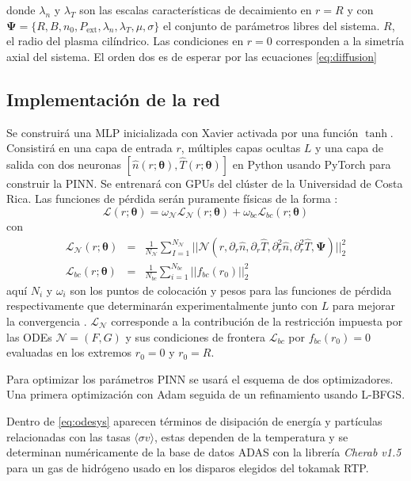 donde $\lambda_n$ y $\lambda_T$ son las escalas características de decaimiento en $r = R$ y con $\bm{\Psi} = \{R, B, n_0, P_\text{ext}, \lambda_n, \lambda_T, \mu, \sigma\}$ el conjunto de parámetros libres del sistema. $R$, el radio del plasma cilíndrico. Las condiciones en $r = 0$ corresponden a la simetría axial del sistema. El orden dos es de esperar por las ecuaciones \eqref{eq:diffusion}
\subsection{Implementación de la red}
Se construirá una MLP inicializada con Xavier activada por una función $\tanh$. Consistirá en una capa de entrada $r$, múltiples capas ocultas $L$ y una capa de salida con dos neuronas $[\hat{n}(r; \bm{\theta}), \hat{T}(r; \bm{\theta})]$ en Python usando PyTorch \cite{pytorch} para construir la PINN. Se entrenará con GPUs del clúster de la Universidad de Costa Rica. Las funciones de pérdida serán puramente físicas de la forma \cite{raissi2019}:
\begin{equation}
	\mathcal{L}(r; \bm{\theta}) = \omega_\mathcal{N} \mathcal{L}_\mathcal{N} (r; \bm{\theta})+ \omega_{bc} \mathcal{L}_{bc}(r; \bm{\theta})
\end{equation}
con
{\small
\begin{eqnarray}
	\mathcal{L}_\mathcal{N} (r; \bm{\theta}) &=&\frac{1}{N_\mathcal{N}}\sum\limits_{I=1}^{N_\mathcal{N}} || \mathcal{N}(r, \partial_r \hat{n}, \partial_r \hat{T}, \partial_r^2 \hat{n}, \partial_r^2\hat{T}, \bm{\Psi}) ||_2^2\\
	\mathcal{L}_{bc}(r; \bm{\theta}) &=& \frac{1}{N_{bc}}\sum\limits_{i=1}^{N_{bc}} || f_{bc}(r_0)||_2^2
\end{eqnarray}}
aquí $N_i$ y $\omega_i$ son los puntos de colocación y pesos  para las funciones de pérdida respectivamente que determinarán experimentalmente junto con $L$ para mejorar la convergencia . $\mathcal{L}_\mathcal{N}$ corresponde a la contribución de la restricción impuesta por las ODEs  $\mathcal{N} = (F,G)$ y sus condiciones de frontera $\mathcal{L}_{bc}$ por $f_{bc}(r_0) = 0$ evaluadas en los extremos $r_0 = 0$ y $r_0 = R$.

Para optimizar los parámetros PINN se usará el esquema de dos optimizadores. Una primera optimización con Adam seguida de un refinamiento usando L-BFGS.

Dentro de \eqref{eq:odesys} aparecen términos de disipación de energía y partículas relacionadas con las tasas $\langle \sigma v \rangle$, estas dependen de la temperatura y se determinan numéricamente de la base de datos ADAS con la librería \textit{Cherab v1.5} \cite{cherab} para un gas de hidrógeno usado en los disparos elegidos del tokamak RTP.
\vspace{- 5 mm}
